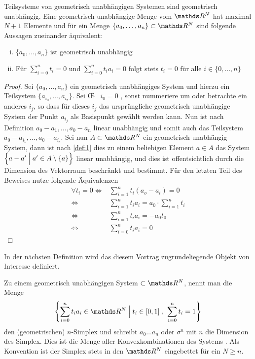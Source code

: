 \begin{Lem}\label{lem:1}
  Teilsysteme von geometrisch unabhängigen Systemen sind geometrisch
  unabhängig. Eine geometrisch unabhängige Menge vom $\R^N$ hat
  maximal $N+1$ Elemente und für ein Menge
  $\{ a_0 , \ldots , a_n \} \subset \R^N$ sind folgende Aussagen
  zueinander äquivalent:
  \begin{enumerate}[i)]
  	\item $\{ a_0 , \ldots , a_n \}$ ist geometrisch unabhängig
  	\item Für $\sum\limits_{i=0}^n t_i = 0$ und $\sum\limits_{i=0}^n t_i a_i = 0$ folgt stets $t_i = 0$ für alle $i \in \{ 0,\ldots,n\}$
  \end{enumerate}
  \begin{proof}
    Sei $\{ a_0 , \ldots , a_n \}$ ein geometrisch unabhängiges System
    und hierzu ein Teilsystem $\{ a_{i_0},\ldots,a_{i_r} \}$.  Sei
    \OE~ $i_0 = 0$ , sonst nummeriere um oder betrachte ein anderes
    $i_j$, so dass für dieses $i_j$ das ursprüngliche geometrisch
    unabhängige System der Punkt $a_{i_j}$ als Basispunkt gewählt
    werden kann. Nun ist nach Definition
    $ a_0 - a_1 , \ldots , a_0 - a_n$ linear unabhängig und somit auch
    das Teilsystem $ a_0 - a_ {i_1}, \ldots , a_0 - a_{i_r}$.  Sei nun
    $A \subset \R^N$ ein geometrisch unabhängig System, dann ist nach
    \cref{def:1} dies zu einem beliebigen Element $a \in A$ das System
    $\left\{  a - a' \; \Big| \; a' \in A \setminus \left\{ a \right\}  \right\}$ linear unabhängig,
    und dies ist offentsichtlich durch die Dimension des Vektorraum
    beschränkt und bestimmt. Für den letzten Teil des Beweises nutze
    folgende Äquivalenzen
		\begin{align*}
			\forall t_i =0 
				\Leftrightarrow
			&\sum\limits_{i=1}^n t_i(a_o - a_i) = 0\\
				\Leftrightarrow
			&\sum\limits_{i=1}^n t_i a_i = a_0 \cdot \sum\limits_{i=1}^n t_i\\
				\Leftrightarrow
			&\sum\limits_{i=1}^n t_i a_i = - a_0 t_0\\
				\Leftrightarrow
			&\sum\limits_{i=0}^n t_i a_i = 0
		\end{align*}
  \end{proof}
\end{Lem}

In der nächsten Definition wird das diesem Vortrag zugrundeliegende
Objekt von Interesse definiert.

\begin{Def}
  Zu einem geometrisch unabhängigen System \gs $\subset \R^N$, nennt man die Menge
  \begin{gather*}
    \set{\sum\limits_{i=0}^n t_i a_i \in \R^N}{ t_i \in [0,1] ~,~
      \sum\limits_{i=0}^n t_i = 1}
  \end{gather*}
  den (geometrischen) $n$-Simplex und schreibt $a_0 \ldots a_n$ oder
  $\sigma^n$ mit $n$ die Dimension des Simplex. Dies ist die Menge
  aller Konvexkombinationen des Systems \gs. Als Konvention ist der
  Simplex stets in den $\R^N$ eingebettet für ein $N \geq n$.
\end{Def}
 
